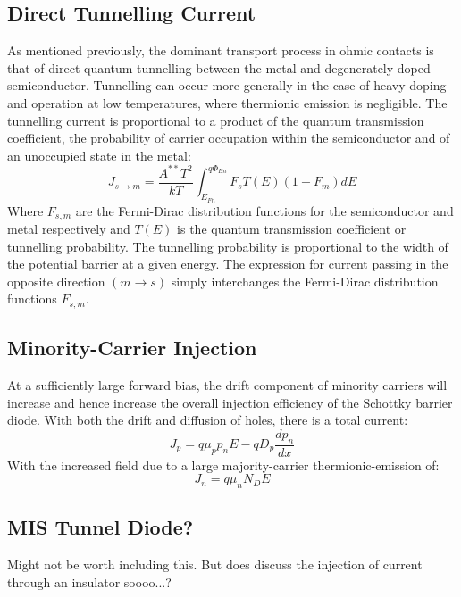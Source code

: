 \subsection{Direct Tunnelling Current}
As mentioned previously, the dominant transport process in ohmic contacts is that of direct quantum tunnelling between the metal and degenerately doped semiconductor. Tunnelling can occur more generally in the case of heavy doping and operation at low temperatures, where thermionic emission is negligible. The tunnelling current is proportional to a product of the quantum transmission coefficient, the probability of carrier occupation within the semiconductor and of an unoccupied state in the metal:
\begin{equation}
	J_{s\rightarrow m} = \frac{A^{**}T^{2}}{kT}\int_{E_{Fn}}^{q\Phi_{Bn}} F_{s}T\left(E\right)\left(1-F_{m}\right)dE
\end{equation}
Where $F_{s,m}$ are the Fermi-Dirac distribution functions for the semiconductor and metal respectively and $T\left(E\right)$ is the quantum transmission coefficient or tunnelling probability. The tunnelling probability is proportional to the width of the potential barrier at a given energy. The expression for current passing in the opposite direction $\left(m\rightarrow s\right)$ simply interchanges the Fermi-Dirac distribution functions $F_{s,m}$.

\subsection{Minority-Carrier Injection}
At a sufficiently large forward bias, the drift component of minority carriers will increase and hence increase the overall injection efficiency of the Schottky barrier diode. With both the drift and diffusion of holes, there is a total current:
\begin{equation}
	J_{p} = q\mu_{p}p_{n}E-qD_{p}\frac{dp_{n}}{dx}
\end{equation}
With the increased field due to a large majority-carrier thermionic-emission of:
\begin{equation}
	J_{n} = q\mu_{n}N_{D}E
\end{equation}
\subsection{MIS Tunnel Diode?}
Might not be worth including this. But does discuss the injection of current through an insulator soooo...?
